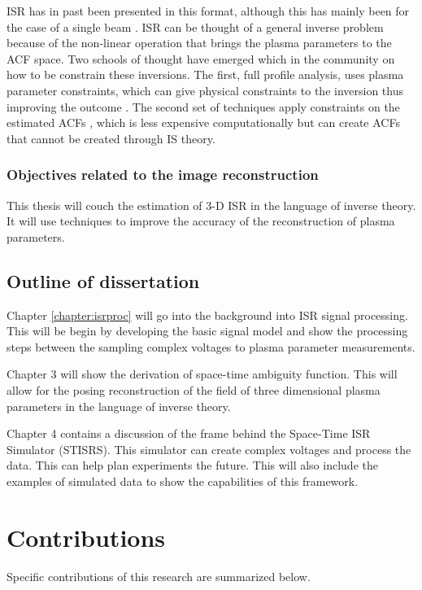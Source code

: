 ISR has in past been presented in this format, although this has mainly been for the case of a single beam \cite{Vierinen:2012ve}. ISR can be thought of a general inverse problem because of the non-linear operation that brings the plasma parameters to the ACF space. Two schools of thought have emerged which in the community on how to be constrain these inversions. The first, full profile analysis, uses plasma parameter constraints, which can give physical constraints to the inversion thus improving the outcome \cite{hysell2008,RDS:RDS3308}. The second set of techniques apply constraints on the estimated ACFs \cite{Virtanen:20082vx,nikoukar2008}, which is less expensive computationally but can create ACFs that cannot be created through IS theory.

\subsubsection{Objectives related to the image reconstruction}
This thesis will couch the estimation of 3-D ISR in the language of inverse theory. It will use techniques to improve the accuracy of the reconstruction of plasma parameters.

\subsection{Outline of dissertation}

Chapter \ref{chapter:isrproc} will go into the background into ISR signal processing. This will be begin by developing the basic signal model and show the processing steps between the sampling complex voltages to plasma parameter measurements.

Chapter 3 will show the derivation of space-time ambiguity function. This will allow for the posing reconstruction of the field of three dimensional plasma parameters in the language of inverse theory. 

Chapter 4 contains a discussion of the frame behind the Space-Time ISR Simulator (STISRS). This simulator can create complex voltages and process the data. This can help plan experiments the future. This will also include the examples of simulated data to show the capabilities of this framework.


\section{Contributions}
Specific contributions of this research are summarized below.


